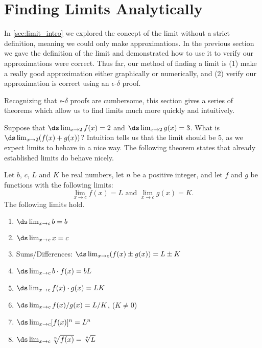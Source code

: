 \section{Finding Limits Analytically}\label{sec:limit_analytically}

In \autoref{sec:limit_intro} we explored the concept of the limit without a strict definition, meaning we could only make approximations. In the previous section we gave the definition of the limit and demonstrated how to use it to verify our approximations were correct. Thus far, our method of finding a limit is (1) make a really good approximation either graphically or numerically, and (2) verify our approximation is correct using an $\epsilon$-$\delta$ proof.

Recognizing that $\epsilon$-$\delta$ proofs are cumbersome, this section gives a series of theorems which allow us to find limits much more quickly and intuitively. \bigskip

Suppose that $\ds\lim_{x\to 2} f(x)=2$ and $\ds\lim_{x\to 2} g(x) = 3$. What is $\ds\lim_{x\to 2}(f(x)+g(x))$? Intuition tells us that the limit should be 5, as we expect limits to behave in a nice way. The following theorem states that already established limits do behave nicely.

\begin{theorem}\label{thm:limit_algebra}
Let $b$, $c$, $L$ and $K$ be real numbers, let $n$ be a positive integer, and let $f$ and $g$ be functions with the following limits: 
\[\lim_{x\to c}f(x) = L \text{\ and\ } \lim_{x\to c} g(x) = K.\]
The following limits hold.
\begin{enumerate}
\newlength{\widest}
\settowidth{\widest}{Sums/Differences:}
\item {} $\ds\lim_{x\to c} b = b$
\item {} $\ds\lim_{x\to c} x = c$
\item Sums/Differences: $\ds\lim_{x\to c}(f(x)\pm g(x)) = L\pm K$
\item {} $\ds\lim_{x\to c} b\cdot f(x) = bL$
\item {} $\ds\lim_{x\to c} f(x)\cdot g(x) = LK$
\item {} $\ds\lim_{x\to c} f(x)/g(x) = L/K$, ($K\neq 0$)
\item {} $\ds\lim_{x\to c} [f(x)]^n = L^n$
\item {} $\ds\lim_{x\to c} \sqrt[n]{f(x)} = \sqrt[n]{L}$ 
\end{enumerate}
\end{theorem}

